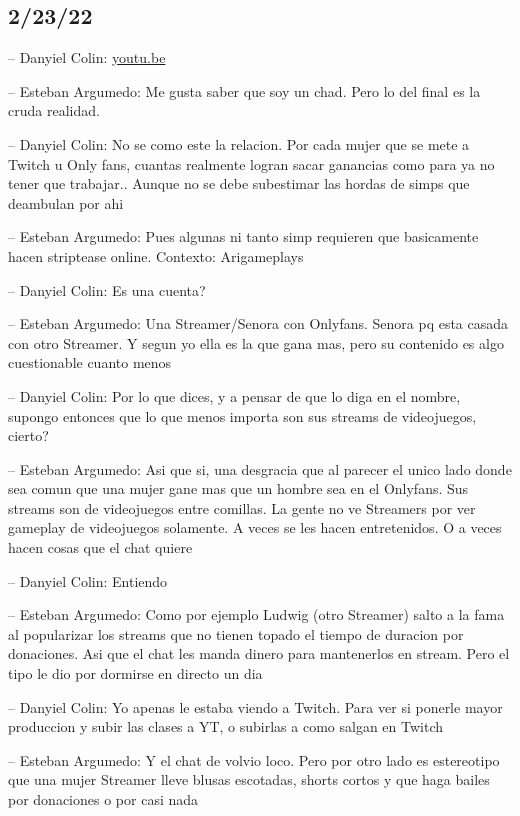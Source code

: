 \hypertarget{section-15}{%
\subsection{2/23/22}\label{section-15}}

-- Danyiel Colin: \href{https://youtu.be/Mr6T86QVKSc}{youtu.be}

-- Esteban Argumedo: Me gusta saber que soy un chad. Pero lo del final
es la cruda realidad.

-- Danyiel Colin: No se como este la relacion. Por cada mujer que se
mete a Twitch u Only fans, cuantas realmente logran sacar ganancias como
para ya no tener que trabajar.. Aunque no se debe subestimar las hordas
de simps que deambulan por ahi

-- Esteban Argumedo: Pues algunas ni tanto simp requieren que
basicamente hacen striptease online. Contexto: Arigameplays

-- Danyiel Colin: Es una cuenta?

-- Esteban Argumedo: Una Streamer/Senora con Onlyfans. Senora pq esta
casada con otro Streamer. Y segun yo ella es la que gana mas, pero su
contenido es algo cuestionable cuanto menos

-- Danyiel Colin: Por lo que dices, y a pensar de que lo diga en el
nombre, supongo entonces que lo que menos importa son sus streams de
videojuegos, cierto?

-- Esteban Argumedo: Asi que si, una desgracia que al parecer el unico
lado donde sea comun que una mujer gane mas que un hombre sea en el
Onlyfans. Sus streams son de videojuegos entre comillas. La gente no ve
Streamers por ver gameplay de videojuegos solamente. A veces se les
hacen entretenidos. O a veces hacen cosas que el chat quiere

-- Danyiel Colin: Entiendo

-- Esteban Argumedo: Como por ejemplo Ludwig (otro Streamer) salto a la
fama al popularizar los streams que no tienen topado el tiempo de
duracion por donaciones. Asi que el chat les manda dinero para
mantenerlos en stream. Pero el tipo le dio por dormirse en directo un
dia

-- Danyiel Colin: Yo apenas le estaba viendo a Twitch. Para ver si
ponerle mayor produccion y subir las clases a YT, o subirlas a como
salgan en Twitch

-- Esteban Argumedo: Y el chat de volvio loco. Pero por otro lado es
estereotipo que una mujer Streamer lleve blusas escotadas, shorts cortos
y que haga bailes por donaciones o por casi nada

